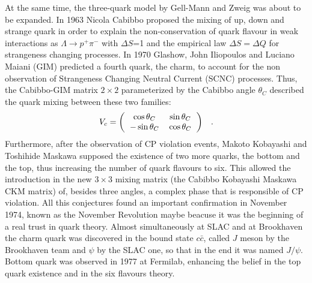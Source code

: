 At the same time, the three-quark model by Gell-Mann and Zweig was about to be expanded. In 1963 Nicola Cabibbo proposed the mixing of up, down and strange quark in order to explain the non-conservation of quark flavour in weak interactions as $\Lambda \rightarrow p^{+}\pi^{-}$ with $\Delta S$=1 and the empirical law $\Delta S = \Delta Q$ for strangeness changing processes. In 1970 Glashow, John Iliopoulos and Luciano Maiani (GIM) predicted a fourth quark, the charm, to account for the non observation of Strangeness Changing Neutral Current (SCNC) processes. Thus, the Cabibbo-GIM matrix $2\times 2$ parameterized by the Cabibbo angle $\theta_{C}$ described the quark mixing between these two families:
\begin{equation}\label{CabibboGIM}
V_{c} = {\setlength\arraycolsep{6pt}
\left( \begin{array}{cc}
\cos\theta_{C} & \sin\theta_{C}\\
-\sin\theta_{C}& \cos\theta_{C}
\end{array}
\right)} \quad .
\end{equation}
Furthermore, after the observation of CP violation events, Makoto Kobayashi and Toshihide Maskawa supposed the existence of two more quarks, the bottom and the top, thus increasing the number of quark flavours to six. This allowed the introduction in the new $3\times 3$ mixing matrix (the Cabibbo Kobayashi Maskawa CKM matrix) of, besides three angles, a complex phase that is responsible of CP violation. All this conjectures found an important confirmation in November 1974, known as the November Revolution maybe beacuse it was the beginning of a real trust in quark theory. Almost simultaneously at SLAC and at Brookhaven the charm quark was discovered in the bound state $c\bar c$, called $J$ meson by the Brookhaven team and $\psi$ by the SLAC one, so that in the end it was named $J/\psi$. Bottom quark was observed in 1977 at Fermilab, enhancing the belief in the top quark existence and in the six flavours theory.

